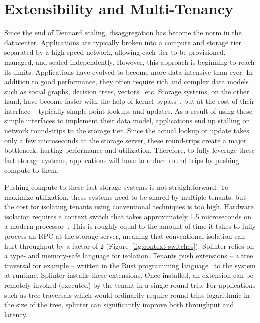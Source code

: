 \chapter{Extensibility and Multi-Tenancy}

Since the end of Dennard scaling, disaggregation has become the norm in
the datacenter.
%
Applications are typically broken into a compute and
storage tier separated by a high speed network, allowing each tier to be
provisioned, managed, and scaled independently.
%
However, this approach
is beginning to reach its limits.
%
Applications have evolved to become more data intensive than ever.
%
In addition to good performance, they often require rich and complex
data models such as social graphs, decision trees,
vectors~\cite{fb-memcache,parameter-server} etc.
%
Storage systems, on the other hand, have become faster with the help of
kernel-bypass~\cite{ramcloud,farm-txns}, but at the cost of their
interface – typically simple point lookups and updates.
%
As a result of using these simple interfaces to implement their data
model, applications end up stalling on network round-trips to the
storage tier.
%
Since the actual lookup or update takes only a few
microseconds at the storage server, these round-trips create a major
bottleneck, hurting performance and utilization.
%
Therefore, to fully
leverage these fast storage systems, applications will have to reduce
round-trips by pushing compute to them.



Pushing compute to these fast storage systems is
not straightforward.
%
To maximize utilization, these
systems need to be shared by multiple tenants,
but the cost for isolating tenants using conventional techniques is too
high.
%
Hardware isolation
requires a context switch that takes approximately
1.5 microseconds on a modern processor~\cite{splinter}.
%
This
is roughly equal to the amount of time it takes to
fully process an RPC at the storage server, meaning
that conventional isolation can hurt throughput by
a factor of 2 (Figure~\ref{fig:context-switches}).
%
Splinter relies on a type- and memory-safe language for isolation.
%
Tenants push
extensions – a tree traversal for example – written in the Rust
programming language~\cite{rust} to the system at runtime.
%
Splinter installs
these extensions.
%
Once installed, an extension can
be remotely invoked (executed) by the tenant in a
single round-trip.
%
For applications such as tree traversals which would ordinarily require
round-trips logarithmic in the size of the tree, splinter can
significantly improve both throughput and latency.

